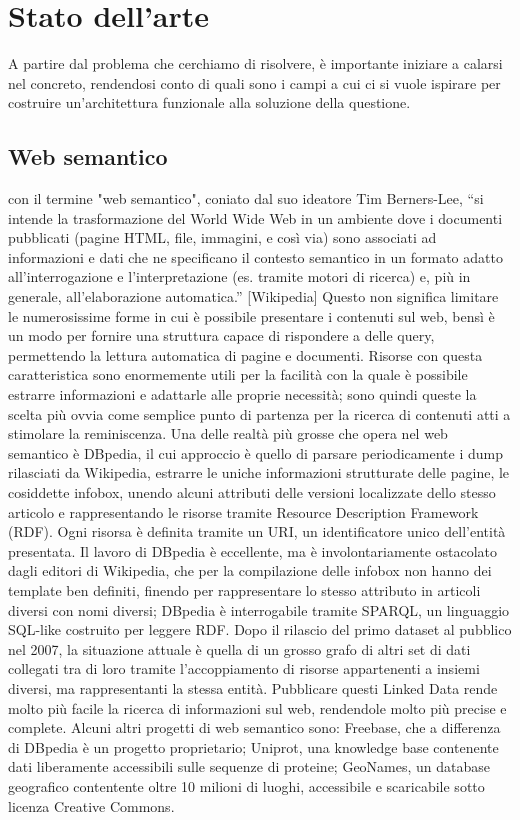 \documentclass[sigproc-sp.tex]{subfiles}
\begin{document}
\section{Stato dell'arte}
A partire dal problema che cerchiamo di risolvere, è importante iniziare a calarsi nel concreto, rendendosi conto di quali sono i campi a cui ci si vuole ispirare per costruire un’architettura funzionale alla soluzione della questione.

\subsection{Web semantico}
con il termine "web semantico", coniato dal suo ideatore Tim Berners-Lee, “si intende la trasformazione del World Wide Web in un ambiente dove i documenti pubblicati (pagine HTML, file, immagini, e così via) sono associati ad informazioni e dati che ne specificano il contesto semantico in un formato adatto all'interrogazione e l'interpretazione (es. tramite motori di ricerca) e, più in generale, all'elaborazione automatica.” [Wikipedia]
Questo non significa limitare le numerosissime forme in cui è possibile presentare i contenuti sul web, bensì è un modo per fornire una struttura capace di rispondere a delle query, permettendo la lettura automatica di pagine e documenti. 
Risorse con questa caratteristica sono enormemente utili per la facilità con la quale è possibile estrarre informazioni e adattarle alle proprie necessità; sono quindi queste la scelta più ovvia come semplice punto di partenza per la ricerca di contenuti atti a stimolare la reminiscenza.
Una delle realtà più grosse che opera nel web semantico è DBpedia, il cui approccio è quello di parsare periodicamente i dump rilasciati da Wikipedia, estrarre le uniche informazioni strutturate delle pagine, le cosiddette infobox, unendo alcuni attributi delle versioni localizzate dello stesso articolo e rappresentando le risorse tramite Resource Description Framework (RDF). Ogni risorsa è definita tramite un URI, un identificatore unico dell’entità presentata. Il lavoro di DBpedia è eccellente, ma è involontariamente ostacolato dagli editori di Wikipedia, che per la compilazione delle infobox non hanno dei template ben definiti, finendo per rappresentare lo stesso attributo in articoli diversi con nomi diversi; DBpedia è interrogabile tramite SPARQL, un linguaggio SQL-like costruito per leggere RDF. Dopo il rilascio del primo dataset al pubblico nel 2007, la situazione attuale è quella di un grosso grafo di altri set di dati collegati tra di loro tramite l’accoppiamento di risorse appartenenti a insiemi diversi, ma rappresentanti la stessa entità. Pubblicare questi Linked Data rende molto più facile la ricerca di informazioni sul web, rendendole molto più precise e complete. Alcuni altri progetti di web semantico sono: Freebase, che a differenza di DBpedia è un progetto proprietario; Uniprot, una knowledge base contenente dati liberamente accessibili sulle sequenze di proteine; GeoNames, un database geografico contentente oltre 10 milioni di luoghi, accessibile e scaricabile sotto licenza Creative Commons.
\end{document}
